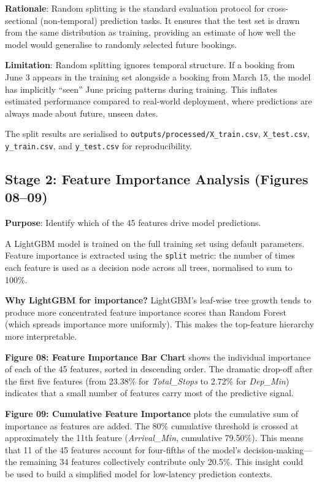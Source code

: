 \documentclass[12pt, a4paper]{article}
\begin{document}
\textbf{Rationale}: Random splitting is the standard evaluation protocol for
cross-sectional (non-temporal) prediction tasks.  It ensures that the test
set is drawn from the same distribution as training, providing an estimate
of how well the model would generalise to randomly selected future bookings.

\textbf{Limitation}: Random splitting ignores temporal structure.  If a
booking from June 3 appears in the training set alongside a booking from
March 15, the model has implicitly ``seen'' June pricing patterns during
training.  This inflates estimated performance compared to real-world
deployment, where predictions are always made about future, unseen dates.

The split results are serialised to
\texttt{outputs/processed/X\_train.csv}, \texttt{X\_test.csv},
\texttt{y\_train.csv}, and \texttt{y\_test.csv} for reproducibility.

\subsection{Stage 2: Feature Importance Analysis (Figures 08--09)}
\label{sec:fi}

\textbf{Purpose}: Identify which of the 45 features drive model predictions.

A LightGBM model is trained on the full training set using default parameters.
Feature importance is extracted using the \texttt{split} metric: the number of
times each feature is used as a decision node across all trees, normalised
to sum to 100\%.

\textbf{Why LightGBM for importance?}  LightGBM's leaf-wise tree growth
tends to produce more concentrated feature importance scores than Random
Forest (which spreads importance more uniformly).  This makes the top-feature
hierarchy more interpretable.

\textbf{Figure 08: Feature Importance Bar Chart} shows the individual
importance of each of the 45 features, sorted in descending order.  The
dramatic drop-off after the first five features (from 23.38\% for
\textit{Total\_Stops} to 2.72\% for \textit{Dep\_Min}) indicates that a
small number of features carry most of the predictive signal.

\textbf{Figure 09: Cumulative Feature Importance} plots the cumulative sum of
importance as features are added.  The 80\% cumulative threshold is crossed
at approximately the 11th feature (\textit{Arrival\_Min}, cumulative 79.50\%).
This means that 11 of the 45 features account for four-fifths of the model's
decision-making---the remaining 34 features collectively contribute only 20.5\%.
This insight could be used to build a simplified model for low-latency
prediction contexts.
\end{document}
